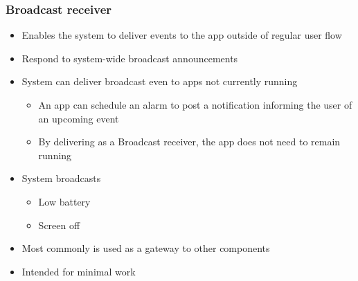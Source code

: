 %
%

\begin{frame}
  \frametitle{Broadcast receiver}
  
  \begin{itemize}
  \item<1-> Enables the system to deliver events to the app outside of
    regular user flow
  
  \item<2-> Respond to system-wide broadcast announcements

  \item<3-> System can deliver broadcast even to apps not currently running
    \begin{itemize}
    \item<4-> An app can schedule an alarm to post a notification
      informing the user of an upcoming event
    \item<5-> By delivering as a Broadcast receiver, the app does not
      need to remain running
    \end{itemize}
    
    
  \item<6-> System broadcasts

    \begin{itemize}
    \item<6-> Low battery
    \item<6-> Screen off
    \end{itemize}

    
  \item<7-> Most commonly is used as a gateway to other components
  \item<8-> Intended for minimal work

  \end{itemize}

\end{frame}


